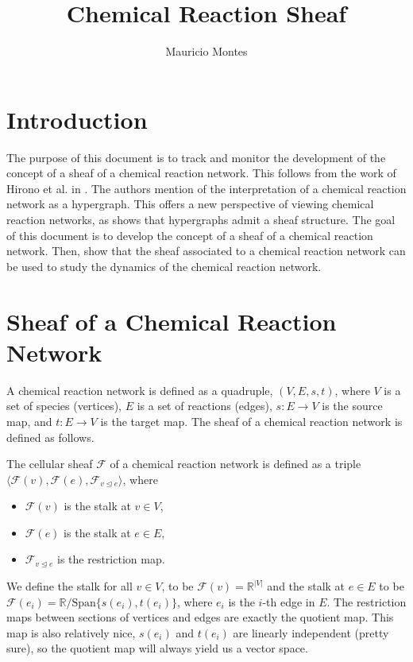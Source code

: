\documentclass[12pt]{article}
\author{Mauricio Montes}
\title{Chemical Reaction Sheaf}
\newcommand{\F}{\mathcal{F}}
\newcommand{\<}{\langle}
\renewcommand{\>}{\rangle}
\begin{document}
\maketitle

\section{Introduction}

The purpose of this document is to track and monitor the development of the concept of
a sheaf of a chemical reaction network. This follows from the work of Hirono et al. in 
\cite{Hirono2021}. The authors mention of the interpretation of a chemical reaction network
as a hypergraph. This offers a new perspective of viewing chemical reaction networks, as 
\cite{duta2023sheaf} shows that hypergraphs admit a sheaf structure. The goal of this document
is to develop the concept of a sheaf of a chemical reaction network. Then, show that the 
sheaf associated to a chemical reaction network can be used to study the dynamics of the
chemical reaction network.

\section{Sheaf of a Chemical Reaction Network}

A chemical reaction network is defined as a quadruple, $(V, E, s, t)$, where $V$ is a set of
species (vertices), $E$ is a set of reactions (edges), $s: E \to V$ is the source map, and
$t: E \to V$ is the target map. The sheaf of a chemical reaction network is defined as follows.

The cellular sheaf $\F$ of a chemical reaction network is defined as a triple $\<\F(v), \F(e),
\F_{v \trianglelefteq e} \>$, where

\begin{itemize}
    \item $\F(v)$ is the stalk at $v \in V$,
    \item $\F(e)$ is the stalk at $e \in E$,
    \item $\F_{v \trianglelefteq e}$ is the restriction map.

\end{itemize}

We define the stalk for all $v \in V$, to be $\F(v) = \mathbb{R}^{|V|}$ and the stalk at $e \in E$ 
to be $\F(e_i) = \mathbb{R} / \text{Span}\{s(e_i), t(e_i)\}$, where $e_i$ is the $i$-th edge in $E$.
The restriction maps between sections of vertices and edges are exactly the quotient map.
This map is also relatively nice, $s(e_i)$ and $t(e_i)$ are linearly independent (pretty sure),
so the quotient map will always yield us a vector space.
\end{document}
